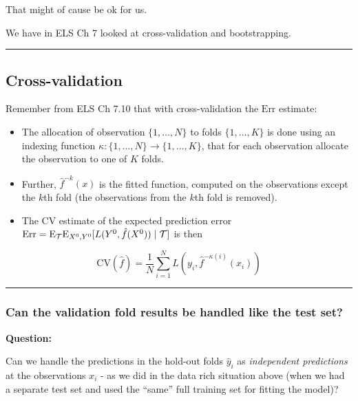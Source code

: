 \documentclass[
  letterpaper,
  DIV=11,
  numbers=noendperiod]{scrartcl}
\begin{document}
That might of cause be ok for us.

We have in ELS Ch 7 looked at cross-validation and bootstrapping.

\begin{center}\rule{0.5\linewidth}{0.5pt}\end{center}

\hypertarget{cross-validation}{%
\subsection{Cross-validation}\label{cross-validation}}

Remember from ELS Ch 7.10 that with cross-validation the \(\text{Err}\)
estimate:

\begin{itemize}
\item
  The allocation of observation \(\{1,\ldots,N\}\) to folds
  \(\{1,\ldots,K\}\) is done using an indexing function
  \(\kappa: \{1,\ldots,N\} \rightarrow \{1,\ldots,K\}\), that for each
  observation allocate the observation to one of \(K\) folds.
\item
  Further, \(\hat{f}^{-k}(x)\) is the fitted function, computed on the
  observations except the \(k\)th fold (the observations from the
  \(k\)th fold is removed).
\item
  The CV estimate of the expected prediction error
  \(\text{Err}=\text{E}_{\cal T} \text{E}_{X^0,Y^0}[L(Y^0,\hat{f}(X^0))\mid {\cal T}]\)
  is then
\end{itemize}

\[ \text{CV}(\hat{f})=\frac{1}{N}\sum_{i=1}^N L(y_i,\hat{f}^{-\kappa(i)}(x_i))\]

\begin{center}\rule{0.5\linewidth}{0.5pt}\end{center}

\hypertarget{can-the-validation-fold-results-be-handled-like-the-test-set}{%
\subsubsection{Can the validation fold results be handled like the test
set?}\label{can-the-validation-fold-results-be-handled-like-the-test-set}}

\textbf{Question:}

Can we handle the predictions in the hold-out folds \(\hat{y}_i\) as
\emph{independent predictions} at the observations \(x_i\) - as we did
in the data rich situation above (when we had a separate test set and
used the ``same'' full training set for fitting the model)?
\end{document}
